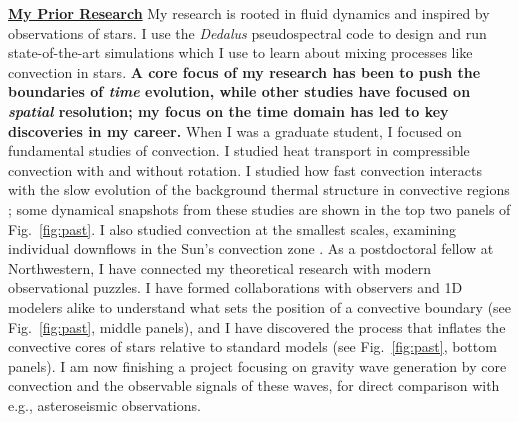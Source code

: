 \documentclass[12pt]{article}
\newcommand{\sct}[1]{\vspace{0.3cm}\hspace{-\parindent}\textbf{\underline{#1}}\hspace{0.3cm}}
\begin{document}
\sct{My Prior Research}
My research is rooted in fluid dynamics and inspired by observations of stars.
I use the \emph{Dedalus} \citep{burns_etal_2020} pseudospectral code to design and run state-of-the-art simulations which I use to learn about mixing processes like convection in stars.
\textbf{A core focus of my research has been to push the boundaries of \emph{time} evolution, while other studies have focused on \emph{spatial} resolution; my focus on the time domain has led to key discoveries in my career.}
When I was a graduate student, I focused on fundamental studies of convection.
I studied heat transport in compressible convection with  \citep{anders_etal_2019_rot} and without \citep{anders_brown_2017} rotation.
I studied how fast convection interacts with the slow evolution of the background thermal structure in convective regions \citep{anders_etal_2018,anders_etal_2020}; some dynamical snapshots from these studies are shown in the top two panels of Fig.~\ref{fig:past}.
I also studied convection at the smallest scales, examining individual downflows in the Sun's convection zone \cite{anders_etal_2019_thermals}.
As a postdoctoral fellow at Northwestern, I have connected my theoretical research with modern observational puzzles.
I have formed collaborations with observers and 1D modelers alike to understand what sets the position of a convective boundary \citep{anders_etal_2022b} (see Fig.~\ref{fig:past}, middle panels), and I have discovered the process that inflates the convective cores of stars relative to standard models \citep{anders_etal_2022a} (see Fig.~\ref{fig:past}, bottom panels).
I am now finishing a project focusing on gravity wave generation by core convection and the observable signals of these waves, for direct comparison with e.g., asteroseismic observations.
\end{document}

